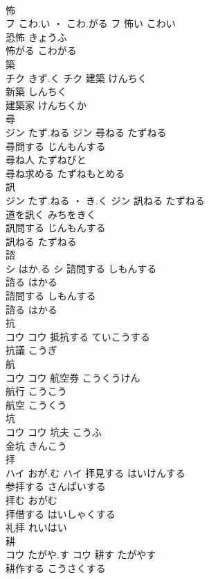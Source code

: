 \documentclass[8pt]{extreport}
\begin{document}
\begin{CJK}{UTF8}{min}
\\	怖	
\\	フ	こわ.い ・ こわ.がる	フ													怖い	こわい	
\\	恐怖	きょうふ	
\\	怖がる	こわがる	
\\	築	
\\	チク	きず.く	チク	建築	けんちく	
\\	新築	しんちく	
\\	建築家	けんちくか	
\\	尋	
\\	ジン	たず.ねる	ジン	尋ねる	たずねる	
\\	尋問する	じんもんする	
\\	尋ね人	たずねびと	
\\	尋ね求める	たずねもとめる	
\\	訊	
\\	ジン	たず.ねる ・ き.く	ジン	訊ねる	たずねる	
\\	道を訊く	みちをきく	
\\	訊問する	じんもんする	
\\	訊ねる	たずねる	
\\	諮	
\\	シ	はか.る	シ	諮問する	しもんする	
\\	諮る	はかる	
\\	諮問する	しもんする	
\\	諮る	はかる	
\\	抗	
\\	コウ		コウ	抵抗する	ていこうする	
\\	抗議	こうぎ	
\\	航	
\\	コウ		コウ	航空券	こうくうけん	
\\	航行	こうこう	
\\	航空	こうくう	
\\	坑	
\\	コウ		コウ													坑夫	こうふ	
\\	金坑	きんこう	
\\	拝	
\\	ハイ	おが.む	ハイ	拝見する	はいけんする	
\\	参拝する	さんぱいする	
\\	拝む	おがむ	
\\	拝借する	はいしゃくする	
\\	礼拝	れいはい	
\\	耕	
\\	コウ	たがや.す	コウ	耕す	たがやす	
\\	耕作する	こうさくする	

\end{CJK}
\end{document}
